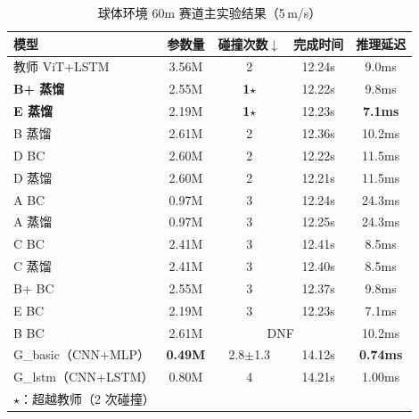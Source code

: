 \documentclass[12pt,a4paper]{article}
\numberwithin{equation}{section}
\numberwithin{figure}{section}
\numberwithin{table}{section}
\begin{document}
\begin{table}[H]
\centering
\caption{球体环境 60m 赛道主实验结果（5\,m/s）}
\label{tab:main-results}
\begin{tabular}{lcccc}
\toprule
模型 & 参数量 & 碰撞次数$\downarrow$ & 完成时间 & 推理延迟 \\
\midrule
教师 ViT+LSTM & 3.56M & 2 & 12.24s & 9.0ms \\
\midrule
\textbf{B+ 蒸馏} & 2.55M & \textbf{1}$\star$ & 12.22s & 9.8ms \\
\textbf{E 蒸馏} & 2.19M & \textbf{1}$\star$ & 12.23s & \textbf{7.1ms} \\
B 蒸馏   & 2.61M & 2 & 12.36s & 10.2ms \\
D BC     & 2.60M & 2 & 12.22s & 11.5ms \\
D 蒸馏   & 2.60M & 2 & 12.21s & 11.5ms \\
A BC     & 0.97M & 3 & 12.24s & 24.3ms \\
A 蒸馏   & 0.97M & 3 & 12.25s & 24.3ms \\
C BC     & 2.41M & 3 & 12.41s & 8.5ms \\
C 蒸馏   & 2.41M & 3 & 12.40s & 8.5ms \\
B+ BC    & 2.55M & 3 & 12.37s & 9.8ms \\
E BC     & 2.19M & 3 & 12.23s & 7.1ms \\
B BC     & 2.61M & \multicolumn{2}{c}{DNF} & 10.2ms \\
G\_basic（CNN+MLP） & \textbf{0.49M} & 2.8$\pm$1.3 & 14.12s & \textbf{0.74ms} \\
G\_lstm（CNN+LSTM） & 0.80M & 4 & 14.21s & 1.00ms \\
\bottomrule
\multicolumn{5}{l}{$\star$：超越教师（2 次碰撞）} \\
\end{tabular}
\end{table}
\end{document}
